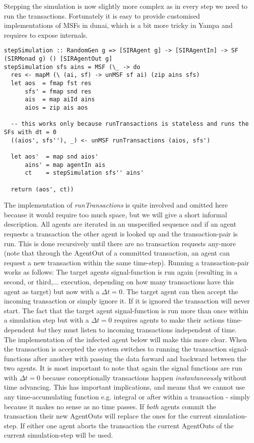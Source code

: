 Stepping the simulation is now slightly more complex as in every step we need to run the transactions. Fortunately it is easy to provide customised implementations of MSFs in dunai, which is a bit more tricky in Yampa and requires to expose internals.

\begin{verbatim}
stepSimulation :: RandomGen g => [SIRAgent g] -> [SIRAgentIn] -> SF (SIRMonad g) () [SIRAgentOut g]
stepSimulation sfs ains = MSF (\_ -> do
  res <- mapM (\ (ai, sf) -> unMSF sf ai) (zip ains sfs)
  let aos  = fmap fst res
      sfs' = fmap snd res
      ais  = map aiId ains
      aios = zip ais aos

  -- this works only because runTransactions is stateless and runs the SFs with dt = 0
  ((aios', sfs''), _) <- unMSF runTransactions (aios, sfs')

  let aos'  = map snd aios'
      ains' = map agentIn ais
      ct    = stepSimulation sfs'' ains'
      
  return (aos', ct))
\end{verbatim}

The implementation of \textit{runTransactions} is quite involved and omitted here because it would require too much space, but we will give a short informal description. All agents are iterated in an unspecified sequence and if an agent requests a transaction the other agent is looked up and the transaction-pair is run. This is done recursively until there are no transaction requests any-more (note that through the AgentOut of a committed transaction, an agent can request a new transaction within the same time-step). Running a transaction-pair works as follows:
The target agents signal-function is run again (resulting in a second, or third,... execution, depending on how many transactions have this agent as target) but now with a $\Delta t = 0$. The target agent can then accept the incoming transaction or simply ignore it. If it is ignored the transaction will never start. The fact that the target agent signal-function is run more than once within a simulation step but with a $\Delta t = 0$ requires agents to make their actions time-dependent \textit{but} they must listen to incoming transactions independent of time. The implementation of the infected agent below will make this more clear.
When the transaction is accepted the system switches to running the transaction signal-functions after another with passing the data forward and backward between the two agents. It is most important to note that again the signal functions are run with $\Delta t = 0$ because conceptionally transactions happen \textit{instantaneously} without time advancing. This has important implications, and means that we cannot use any time-accumulating function e.g. integral or after within a transaction - simply because it makes no sense as no time passes. If \textit{both} agents commit the transaction their new AgentOuts will replace the ones for the current simulation-step. If either one agent aborts the transaction the current AgentOuts of the current simulation-step will be used.

